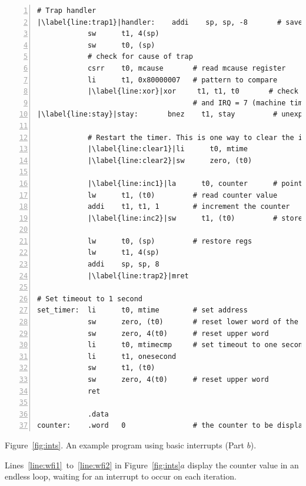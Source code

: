 \documentclass[11pt, twoside, pdftex]{article}
\begin{document}
\begin{center}
\begin{minipage}[h]{15 cm}
\begin{lstlisting}[style=defaultNiosVStyle, name=ints, numbers=left, escapechar=|]
# Trap handler
|\label{line:trap1}|handler:    addi    sp, sp, -8       # save regs that will be modified
            sw      t1, 4(sp)
            sw      t0, (sp)
            # check for cause of trap
            csrr    t0, mcause       # read mcause register
            li      t1, 0x80000007   # pattern to compare
            |\label{line:xor}|xor     t1, t1, t0       # check interrupt bit (b_31)
                                     # and IRQ = 7 (machine timer)
|\label{line:stay}|stay:       bnez    t1, stay         # unexpected cause of exception
            
            # Restart the timer. This is one way to clear the interrupt
            |\label{line:clear1}|li      t0, mtime
            |\label{line:clear2}|sw      zero, (t0)

            |\label{line:inc1}|la      t0, counter      # pointer to counter
            lw      t1, (t0)         # read counter value
            addi    t1, t1, 1        # increment the counter
            |\label{line:inc2}|sw      t1, (t0)         # store counter to memory

            lw      t0, (sp)         # restore regs
            lw      t1, 4(sp)
            addi    sp, sp, 8
            |\label{line:trap2}|mret

# Set timeout to 1 second
set_timer:  li      t0, mtime        # set address
            sw      zero, (t0)       # reset lower word of the timer
            sw      zero, 4(t0)      # reset upper word
            li      t0, mtimecmp     # set timeout to one second
            li      t1, onesecond
            sw      t1, (t0)
            sw      zero, 4(t0)      # reset upper word
            ret
     
            .data
counter:    .word   0                # the counter to be displayed\end{lstlisting}

\vspace{0.25in}
Figure~\ref{fig:ints}.	An example program using basic interrupts (Part $b$).
\end{minipage}
\end{center}

Lines~\ref{line:wfi1}~to~\ref{line:wfi2} in Figure~\ref{fig:ints}$a$ 
display the counter value in an endless loop,
waiting for an interrupt to occur on each iteration. 
\end{document}
